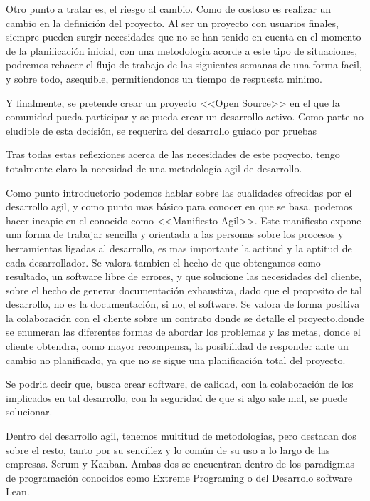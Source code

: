 Otro punto a tratar es, el riesgo al cambio. Como de costoso es realizar un
cambio en la definición del proyecto. Al ser un proyecto con usuarios finales,
siempre pueden surgir necesidades que no se han tenido en cuenta en el momento
de la planificación inicial, con una metodologia acorde a este tipo de
situaciones, podremos rehacer el flujo de trabajo de las siguientes semanas de
una forma facil, y sobre todo, asequible, permitiendonos un tiempo de respuesta
minimo.

Y finalmente, se pretende crear un proyecto <<Open Source>> en el que la
comunidad pueda participar y se pueda crear un desarrollo activo. Como parte no
eludible de esta decisión, se requerira del desarrollo guiado por pruebas

Tras todas estas reflexiones acerca de las necesidades de este proyecto,
tengo totalmente claro la necesidad de una metodología agil de desarrollo.

Como punto introductorio podemos hablar sobre las cualidades ofrecidas por el desarrollo agil, y como punto mas básico para
conocer en que se basa, podemos hacer incapie en el conocido como <<Manifiesto
Agil>>\cite{agilemanifesto2001}. Este manifiesto expone una forma de trabajar sencilla y orientada a las
personas sobre los procesos y herramientas ligadas al desarrollo, es mas
importante la actitud y la aptitud de cada desarrollador. Se valora tambien el hecho de que obtengamos como resultado, un software
libre de errores, y que solucione las necesidades del cliente, sobre el hecho de
generar documentación exhaustiva, dado que el proposito de tal desarrollo, no es
la documentación, si no, el software. Se valora de forma positiva la colaboración
con el cliente sobre un contrato donde se detalle el proyecto,donde se enumeran las diferentes formas de abordar los problemas
y las metas, donde el cliente obtendra, como mayor recompensa, la posibilidad de
responder ante un cambio no planificado, ya que no se sigue una planificación
total del proyecto.\cite{Hunt2006}\cite{HAzzan2014}

Se podria decir que, busca crear software, de calidad, con la colaboración de
los implicados en tal desarrollo, con la seguridad de que si algo sale mal, se
puede solucionar.

Dentro del desarrollo agil, tenemos multitud de metodologias, pero destacan dos
sobre el resto, tanto por su sencillez y lo común de su uso a lo largo de las
empresas. Scrum y Kanban. Ambas dos se encuentran dentro de los paradigmas de programación conocidos
como Extreme Programing o del Desarrolo software Lean.

